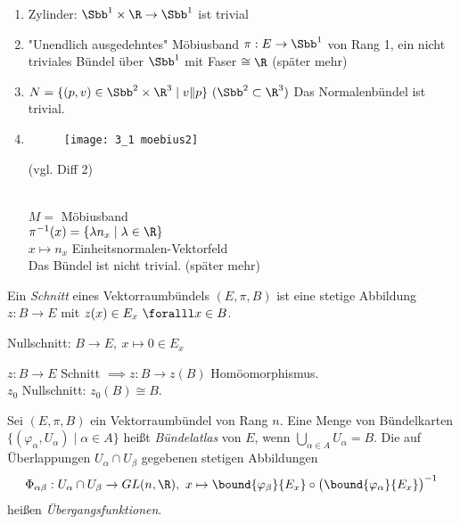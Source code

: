 \begin{exmp*}
	\begin{enumerate}[label = {\roman*})]
		\item 	Zylinder: $ \Sbb^1 \times \R \to \Sbb^1 $ ist trivial
		\item "Unendlich ausgedehntes" Möbiusband  $ \pi: E \to \Sbb^1 $ von Rang 1, ein nicht triviales Bündel über $\Sbb^1$ mit Faser $\cong \R$ (später mehr)
		\item $ N = \{(p,v) \in \Sbb^2 \times \R^3 \mid v \| p\}\ (\Sbb^2 \subset \R^3) $
			Das Normalenbündel ist trivial.
		\item \begin{minipage}{\linewidth}
				\begin{wrapfigure}{R}{5cm}
					\centering
					\texttt{[image: 3\_1 moebius2]}
				\end{wrapfigure}
				(vgl. Diff 2)
			\end{minipage} \\
			$ M = $ Möbiusband\\
			$ \pi^{-1}(x) = \{\lambda n_x \mid \lambda \in \R\} $\\
			$ x \mapsto n_x$ Einheitsnormalen-Vektorfeld\\
			Das Bündel ist nicht trivial. (später mehr)
	\end{enumerate}
\end{exmp*}

\begin{defn}[Schnitt]
	Ein \emph{Schnitt} eines Vektorraumbündels $ (E,\pi,B) $ ist eine stetige Abbildung $ z: B \to E $ mit $z(x) \in E_x\ \foralll x \in B$.
\end{defn}
	
\begin{exmp*}
	Nullschnitt: $ B \to E,\ x \mapsto 0 \in E_x $
\end{exmp*}

\begin{rem*}
	$ z: B \to E $ Schnitt $ \implies z: B \to z(B) $ Homöomorphismus.\\
	$z_0$ Nullschnitt: $z_0(B) \cong B$.
\end{rem*}

\begin{defn} 
	Sei $ (E,\pi,B) $ ein Vektorraumbündel von Rang $n$. Eine Menge von Bündelkarten $ \{(\varphi_\alpha, U_\alpha) \mid \alpha \in A\} $ heißt \emph{Bündelatlas} von $E$, wenn $ \bigcup_{\alpha \in A} U_\alpha = B. $
	Die auf Überlappungen $ U_\alpha \cap U_\beta $ gegebenen stetigen Abbildungen 
	$$ \Phi_{\alpha \beta}: U_\alpha \cap U_\beta \to GL(n,\R),\ x \mapsto \bound{\varphi_\beta}{E_x} \circ \big( \bound{ \varphi_\alpha}{E_x} \big)^{-1} $$
	heißen \emph{Übergangsfunktionen}.
\end{defn}

